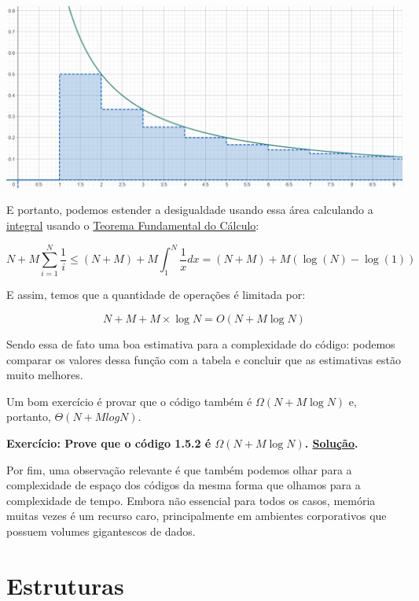 \documentclass[11pt, a4paper]{article}
\begin{document}
\begin{center}
    \includegraphics[width=40em]{Imagens/smallharmonicarea.png}
\end{center}

E portanto, podemos estender a desigualdade usando essa área calculando a \href{https://en.wikipedia.org/wiki/Integral}{integral} usando o \href{https://en.wikipedia.org/wiki/Fundamental_theorem_of_calculus}{Teorema Fundamental do Cálculo}:

\[N+M\sum_{i=1}^{N}\frac{1}{i} \leq (N+M)+M\int_{1}^{N}\frac{1}{x}dx=(N+M)+M(\log(N)-\log(1))\]

E assim, temos que a quantidade de operações é limitada por:

\[N+M+M\times\log N=O(N+M\log N)\]

Sendo essa de fato uma boa estimativa para a complexidade do código: podemos comparar os valores dessa função com a tabela e concluir que as estimativas estão muito melhores. 

Um bom exercício é provar que o código também é \(\Omega(N+M \log N)\) e, portanto, \(\Theta(N + MlogN)\). 

\textbf{Exercício: Prove que o código 1.5.2 é \(\Omega(N+M \log N)\). \hyperref[sol_ex1.5.a]{Solução}.}

\label{ex1.5.a}

Por fim, uma observação relevante é que também podemos olhar para a complexidade de espaço dos códigos da mesma forma que olhamos para a complexidade de tempo. Embora não essencial para todos os casos, memória muitas vezes é um recurso caro, principalmente em ambientes corporativos que possuem volumes gigantescos de dados.

\newpage

\section{Estruturas}
\end{document}
